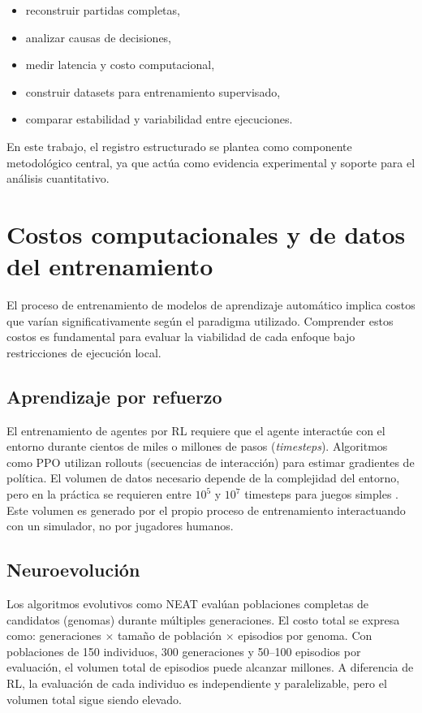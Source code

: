 \begin{itemize}
    \item reconstruir partidas completas,
    \item analizar causas de decisiones,
    \item medir latencia y costo computacional,
    \item construir datasets para entrenamiento supervisado,
    \item comparar estabilidad y variabilidad entre ejecuciones.
\end{itemize}

En este trabajo, el registro estructurado se plantea como componente metodológico central, ya que actúa como evidencia experimental y soporte para el análisis cuantitativo.

\section{Costos computacionales y de datos del entrenamiento}

El proceso de entrenamiento de modelos de aprendizaje automático implica costos que varían significativamente según el paradigma utilizado. Comprender estos costos es fundamental para evaluar la viabilidad de cada enfoque bajo restricciones de ejecución local.

\subsection{Aprendizaje por refuerzo}

El entrenamiento de agentes por RL requiere que el agente interactúe con el entorno durante cientos de miles o millones de pasos (\textit{timesteps}). Algoritmos como PPO \cite{schulman2017ppo} utilizan rollouts (secuencias de interacción) para estimar gradientes de política. El volumen de datos necesario depende de la complejidad del entorno, pero en la práctica se requieren entre $10^5$ y $10^7$ timesteps para juegos simples \cite{sutton2018reinforcement}. Este volumen es generado por el propio proceso de entrenamiento interactuando con un simulador, no por jugadores humanos.

\subsection{Neuroevolución}

Los algoritmos evolutivos como NEAT \cite{stanley2002neat} evalúan poblaciones completas de candidatos (genomas) durante múltiples generaciones. El costo total se expresa como: generaciones $\times$ tamaño de población $\times$ episodios por genoma. Con poblaciones de 150 individuos, 300 generaciones y 50--100 episodios por evaluación, el volumen total de episodios puede alcanzar millones. A diferencia de RL, la evaluación de cada individuo es independiente y paralelizable, pero el volumen total sigue siendo elevado.

